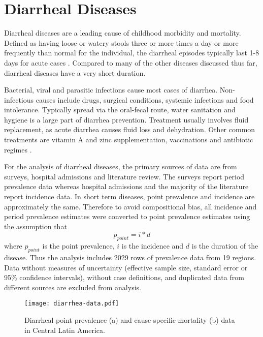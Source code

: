 \chapter{Diarrheal Diseases}
\label{applications-short_dur}

Diarrheal diseases are a leading cause of childhood morbidity and mortality.  Defined as having loose or watery stools three or more times a day or more frequently than normal for the individual, the diarrheal episodes typically last 1-8 days for acute cases \cite{unicef_diarrhoea_2009, carlos_etiology_1990, lamberti_systematic_2012}.  Compared to many of the other diseases discussed thus far, diarrheal diseases have a very short duration.

Bacterial, viral and parasitic infections cause most cases of diarrhea.  Non-infectious causes include drugs, surgical conditions, systemic infections and food intolerance.  Typically spread via the oral-fecal route, water sanitation and hygiene is a large part of diarrhea prevention.  Treatment usually involves fluid replacement, as acute diarrhea causes fluid loss and dehydration.  Other common treatments are vitamin A and zinc supplementation, vaccinations and antibiotic regimes \cite{unicef_diarrhoea_2009, carlos_etiology_1990, lamberti_systematic_2012}.

For the analysis of diarrheal diseases, the primary sources of data are from surveys, hospital admissions and literature review.  The surveys report period prevalence data whereas hospital admissions and the majority of the literature report incidence data.  In short term diseases, point prevalence and incidence are approximately the same.  Therefore to avoid compositional bias, all incidence and period prevalence estimates were converted to point prevalence estimates using the assumption that
    \begin{equation}
    	p_{point}=i*d
    \end{equation}
where $p_{point}$ is the point prevalence, $i$ is the incidence and $d$ is the duration of the disease.  Thus the analysis includes 2029 rows of prevalence data from 19 regions.  Data without measures of uncertainty (effective sample size, standard error or 95\% confidence intervals), without case definitions, and duplicated data from different sources are excluded from analysis.

    \begin{figure}[h]
        \begin{center}
            \texttt{[image: diarrhea-data.pdf]}
            \caption{Diarrheal point prevalence (a) and cause-specific mortality (b) data in Central Latin America.}
            \label{fig:app-diarrhea data}
        \end{center}
    \end{figure}

